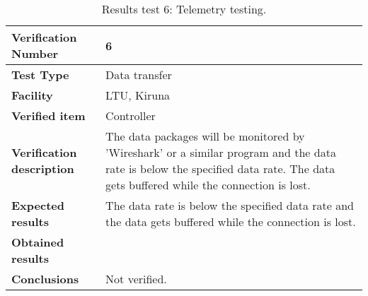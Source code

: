 \begin{table}[H]
\centering

\begin{tabular}{|m{}| m{} |}
\hline
\textbf{Verification Number} 		& 6 				\\ \hline
\textbf{Test Type} 					& Data transfer 	\\ \hline
\textbf{Facility} 					& LTU, Kiruna 		\\ \hline
\textbf{Verified item} 				& Controller 		\\ \hline

\textbf{Verification description} 	& The data packages will be monitored by 'Wireshark' or a similar program and the data rate is below the specified data rate. The data gets buffered while the connection is lost. \\ \hline

\textbf{Expected results} 			& The data rate is below the specified data rate and the data gets buffered while the connection is lost. \\ \hline

\textbf{Obtained results} 			& \\ \hline

\textbf{Conclusions} 				& Not verified.		\\ \hline
\end{tabular}
\caption{Results test 6: Telemetry testing.}
\label{tab:testresult6:telemetry}
\end{table}


\raggedbottom
